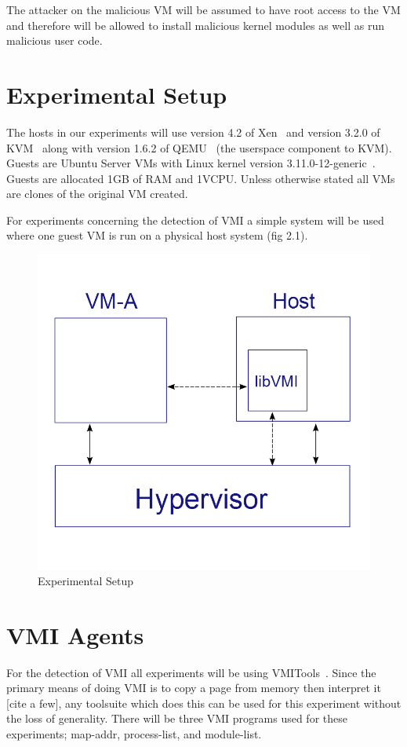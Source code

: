 	The attacker on the malicious VM will be assumed to have root access to the VM and therefore will be allowed to install malicious kernel modules as well as run malicious user code. 

\section{Experimental Setup}

	The hosts in our experiments will use version 4.2 of Xen~\cite{barham_xen_2003} and version 3.2.0 of KVM ~\cite{kivity_kvm:_2007}along with version 1.6.2 of QEMU~\cite{bellard_qemu_2005} (the userspace component to KVM). Guests are Ubuntu Server VMs with Linux kernel version 3.11.0-12-generic~\cite{_Linux_archive}. Guests are allocated 1GB of RAM and 1VCPU. Unless otherwise stated all VMs are clones of the original VM created. 

	For experiments concerning the detection of VMI a simple system will be used where one guest VM is run on a physical host system (fig 2.1). 

	\begin{figure}\label{ExpApp}
	  \centering
	  \includegraphics[width=\textwidth]{figures/BM_graph3_cropped.png}
	  \caption{Experimental Setup}
	\end{figure}

\section{VMI Agents}
For the detection of VMI all experiments will be using VMITools~\cite{payne_vmitools_2014}. Since the primary means of doing VMI is to copy a page from memory then interpret it [cite a few], any toolsuite which does this can be used for this experiment without the loss of generality. There will be three VMI programs used for these experiments; map-addr, process-list, and module-list. 

